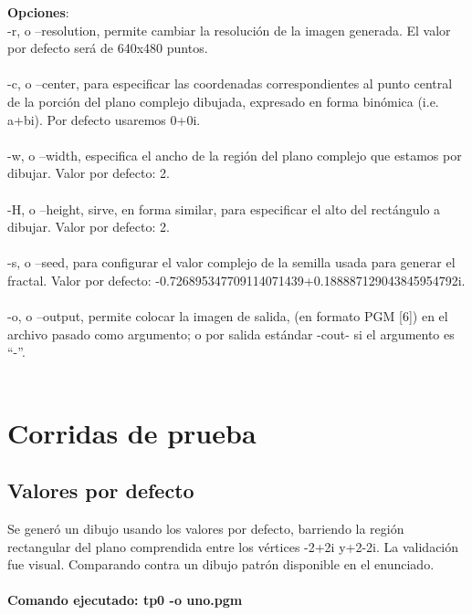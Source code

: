 \documentclass [12pt, a4paper]{article}
\begin{document}
	\textbf{Opciones}:\\
	-r, o --resolution, permite cambiar la resolución de la imagen generada. El valor por defecto será de 640x480 puntos.\\\\
	-c, o --center, para especificar las coordenadas correspondientes al punto central de la porción del plano complejo dibujada, expresado en forma binómica (i.e. a+bi). Por defecto usaremos 0+0i.\\\\
	-w, o --width, especifica el ancho de la región del plano complejo que estamos por dibujar. Valor por defecto: 2.\\\\
	-H, o --height, sirve, en forma similar, para especificar el alto del rectángulo a dibujar. Valor por defecto: 2.\\\\
	-s, o --seed, para configurar el valor complejo de la semilla usada para generar el fractal. Valor por defecto: -0.726895347709114071439+0.188887129043845954792i.\\\\
	-o, o --output, permite colocar la imagen de salida, (en formato PGM [6]) en el archivo pasado como argumento; o por salida estándar -cout- si el argumento es “-”.\\\\
	
	
	\section{Corridas de prueba}
	\subsection{Valores por defecto}
	Se generó un dibujo usando los valores por defecto, barriendo la región rectangular del plano comprendida entre los vértices -2+2i y+2-2i.	La validación fue visual. Comparando contra un dibujo patrón disponible en el enunciado.
	
	\paragraph{Comando ejecutado: tp0 -o uno.pgm }
	
\end{document}
